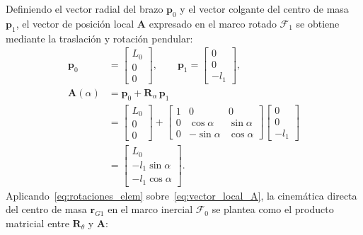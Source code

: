 Definiendo el vector radial del brazo $\mathbf{p}_0$ y el vector colgante del centro de masa $\mathbf{p}_1$, el vector de posición local $\mathbf{A}$ expresado en el marco rotado $\mathcal{F}_1$ se obtiene mediante la traslación y rotación pendular:
\begin{equation}
    \begin{aligned}
        \mathbf{p}_0 &= \begin{bmatrix} L_0 \\ 0 \\ 0 \end{bmatrix}, \qquad
        \mathbf{p}_1 = \begin{bmatrix} 0 \\ 0 \\ -l_1 \end{bmatrix}, \\[4pt]
        \mathbf{A}(\alpha) &= \mathbf{p}_0 + \mathbf{R}_\alpha\,\mathbf{p}_1 \\[3pt]
        &= \begin{bmatrix} L_0 \\ 0 \\ 0 \end{bmatrix}
        + \begin{bmatrix}
            1 & 0 & 0 \\
            0 & \cos\alpha & \sin\alpha \\
            0 & -\sin\alpha & \cos\alpha
        \end{bmatrix}
        \begin{bmatrix} 0 \\ 0 \\ -l_1 \end{bmatrix} \\[3pt]
        &= \begin{bmatrix} L_0 \\ -l_1\sin\alpha \\ -l_1\cos\alpha \end{bmatrix}.
    \end{aligned}
    \label{eq:vector_local_A}
\end{equation}
Aplicando~\eqref{eq:rotaciones_elem} sobre~\eqref{eq:vector_local_A}, la cinemática directa del centro de masa $\mathbf{r}_{G1}$ en el marco inercial $\mathcal{F}_0$ se plantea como el producto matricial entre $\mathbf{R}_\theta$ y $\mathbf{A}$:
